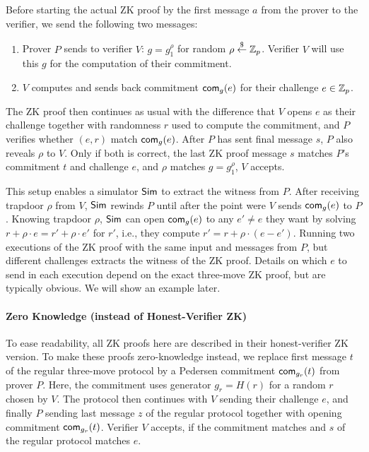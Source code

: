Before starting the actual ZK proof by the first message $a$ from the
prover to the verifier, we send the following two messages:
\begin{enumerate}
\item Prover $P$ sends to verifier $V$: $g=g_1^\rho$ for random
  $\rho\stackrel{\$}{\leftarrow}\mathbb{Z}_p$. Verifier $V$ will use this $g$ for the computation
  of their commitment.
  \item $V$ computes and sends back commitment $\mathsf{com}_g(e)$ for their
    challenge $e\in\mathbb{Z}_p$.
\end{enumerate}

The ZK proof then continues as usual with the difference that $V$
opens $e$ as their challenge together with randomness $r$ used to
compute the commitment, and $P$ verifies whether $(e,r)$ match
$\mathsf{com}_g(e)$.  After $P$ has sent final message $s$, $P$ also
reveals $\rho$ to $V$. Only if both is correct, the last ZK proof
message $s$ matches $P$'s commitment $t$ and challenge $e$, and $\rho$
matches $g=g_1^\rho$, $V$ accepts.

This setup enables a simulator ${\mathsf{Sim}}$ to extract the witness from
$P$. After receiving trapdoor $\rho$ from $V$, ${\mathsf{Sim}}$ rewinds $P$ until
after the point were $V$ sends $\mathsf{com}_g(e)$ to $P$. Knowing trapdoor
$\rho$, ${\mathsf{Sim}}$ can open $\mathsf{com}_g(e)$ to any $e'\neq{}e$ they want by
solving $r+\rho\cdot{}e=r'+\rho\cdot{}e'$ for $r'$, i.e., they compute
$r'=r+\rho\cdot{}(e-e')$. Running two executions of the ZK proof with the
same input and messages from $P$, but different challenges extracts
the witness of the ZK proof. Details on which $e$ to send in each
execution depend on the exact three-move ZK proof, but are typically
obvious. We will show an example later.

\paragraph{Zero Knowledge (instead of Honest-Verifier ZK)}
To ease readability, all ZK proofs here are described in their
honest-verifier ZK version. To make these proofs zero-knowledge
instead, we replace first message $t$ of the regular three-move
protocol by a Pedersen commitment $\mathsf{com}_{g_r}(t)$ from prover
$P$. Here, the commitment uses generator $g_r=H(r)$ for a random $r$
chosen by $V$. The protocol then continues with $V$ sending their
challenge $e$, and finally $P$ sending last message $z$ of the regular
protocol together with opening commitment $\mathsf{com}_{g_r}(t)$. Verifier
$V$ accepts, if the commitment matches and $s$ of the regular protocol
matches $e$.

